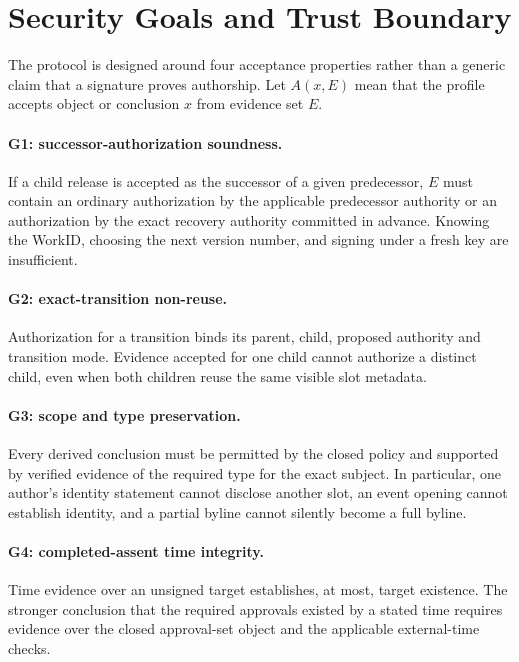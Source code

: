 \documentclass[acmsmall,screen,review,nonacm]{acmart}
\begin{document}
\section{Security Goals and Trust Boundary}
\label{sec:security-goals}

The protocol is designed around four acceptance properties rather than a
generic claim that a signature proves authorship.  Let $A(x,E)$ mean that the
profile accepts object or conclusion $x$ from evidence set $E$.

\paragraph{G1: successor-authorization soundness.}
If a child release is accepted as the successor of a given predecessor, $E$
must contain an ordinary authorization by the applicable predecessor authority
or an authorization by the exact recovery authority committed in advance.
Knowing the WorkID, choosing the next version number, and signing under a fresh
key are insufficient.

\paragraph{G2: exact-transition non-reuse.}
Authorization for a transition binds its parent, child, proposed authority and
transition mode.  Evidence accepted for one child cannot authorize a distinct
child, even when both children reuse the same visible slot metadata.

\paragraph{G3: scope and type preservation.}
Every derived conclusion must be permitted by the closed policy and supported
by verified evidence of the required type for the exact subject.  In
particular, one author's identity statement cannot disclose another slot, an
event opening cannot establish identity, and a partial byline cannot silently
become a full byline.

\paragraph{G4: completed-assent time integrity.}
Time evidence over an unsigned target establishes, at most, target existence.
The stronger conclusion that the required approvals existed by a stated time
requires evidence over the closed approval-set object and the applicable
external-time checks.
\end{document}
